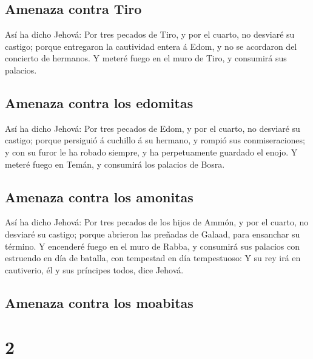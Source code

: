 \hypertarget{amenaza-contra-tiro}{%
\subsection{Amenaza contra Tiro}\label{amenaza-contra-tiro}}

 Así ha dicho Jehová: Por tres pecados de Tiro, y por el
cuarto, no desviaré su castigo; porque entregaron la cautividad entera á
Edom, y no se acordaron del concierto de hermanos.  Y
meteré fuego en el muro de Tiro, y consumirá sus palacios.

\hypertarget{amenaza-contra-los-edomitas}{%
\subsection{Amenaza contra los
edomitas}\label{amenaza-contra-los-edomitas}}

 Así ha dicho Jehová: Por tres pecados de Edom, y por el
cuarto, no desviaré su castigo; porque persiguió á cuchillo á su
hermano, y rompió sus conmiseraciones; y con su furor le ha robado
siempre, y ha perpetuamente guardado el enojo.  Y meteré
fuego en Temán, y consumirá los palacios de Bosra.

\hypertarget{amenaza-contra-los-amonitas}{%
\subsection{Amenaza contra los
amonitas}\label{amenaza-contra-los-amonitas}}

 Así ha dicho Jehová: Por tres pecados de los hijos de
Ammón, y por el cuarto, no desviaré su castigo; porque abrieron las
preñadas de Galaad, para ensanchar su término.  Y
encenderé fuego en el muro de Rabba, y consumirá sus palacios con
estruendo en día de batalla, con tempestad en día tempestuoso:
 Y su rey irá en cautiverio, él y sus príncipes todos,
dice Jehová.

\hypertarget{amenaza-contra-los-moabitas}{%
\subsection{Amenaza contra los
moabitas}\label{amenaza-contra-los-moabitas}}

\hypertarget{section-30-2}{%
\section{2}\label{section-30-2}}

